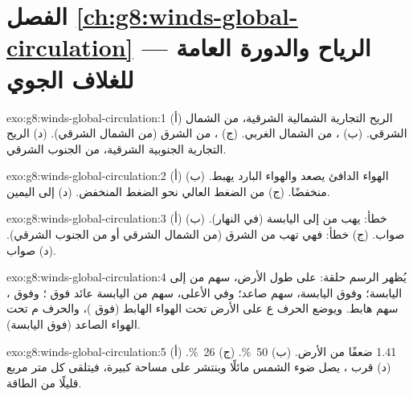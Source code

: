 \section*{الفصل \ref{ch:g8:winds-global-circulation} --- الرياح والدورة العامة للغلاف الجوي}

\begin{solution}{exo:g8:winds-global-circulation:1}
(أ) الريح التجارية الشمالية الشرقية، من الشمال الشرقي. (ب) ،
من الشمال الغربي. (ج) ، من الشرق (من الشمال
الشرقي). (د) الريح التجارية الجنوبية الشرقية، من الجنوب الشرقي.
\end{solution}

\begin{solution}{exo:g8:winds-global-circulation:2}
(أ) الهواء الدافئ يصعد والهواء البارد يهبط. (ب) منخفضًا. (ج) من الضغط العالي
نحو الضغط المنخفض. (د) إلى اليمين.
\end{solution}

\begin{solution}{exo:g8:winds-global-circulation:3}
(أ) خطأ:  يهب من  إلى اليابسة (في النهار).
(ب) صواب. (ج) خطأ: فهي تهب من الشرق (من الشمال الشرقي أو من الجنوب
الشرقي). (د) صواب.
\end{solution}

\begin{solution}{exo:g8:winds-global-circulation:4}
يُظهر الرسم حلقة: على طول الأرض، سهم من  إلى اليابسة؛ وفوق اليابسة،
سهم صاعد؛ وفي الأعلى، سهم من اليابسة عائد فوق ؛ وفوق ، سهم
هابط. ويوضع الحرف ع على الأرض تحت الهواء الهابط (فوق )، والحرف م تحت
الهواء الصاعد (فوق اليابسة).
\end{solution}

\begin{solution}{exo:g8:winds-global-circulation:5}
(أ) 1.41 ضعفًا من الأرض. (ب) 50~\%. (ج) 26~\%. (د) قرب ،
يصل ضوء الشمس مائلًا وينتشر على مساحة كبيرة، فيتلقى كل متر مربع قليلًا
من الطاقة.
\end{solution}

